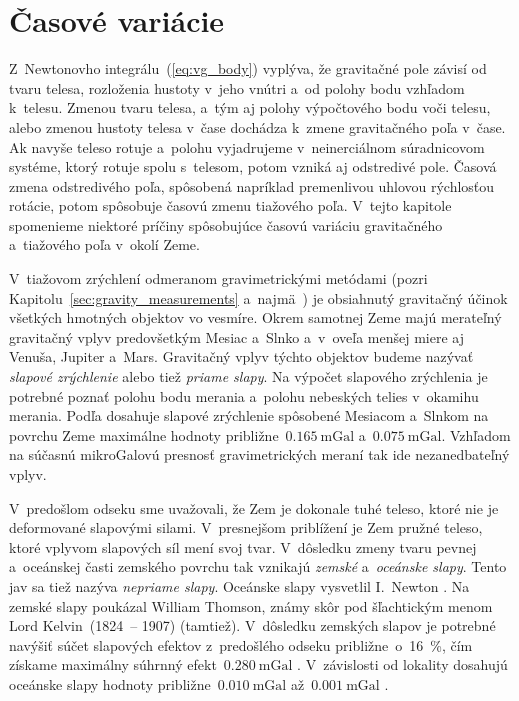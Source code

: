 \documentclass[a4paper, 12pt]{book}
\begin{document}
\section{Časové variácie}
\label{sec:time_variable_gravity}

Z~Newtonovho integrálu~(\ref{eq:vg_body}) vyplýva, že gravitačné pole závisí od 
tvaru telesa, rozloženia hustoty v~jeho vnútri a~od polohy bodu vzhľadom 
k~telesu.  Zmenou tvaru telesa, a~tým aj polohy výpočtového bodu voči telesu, 
alebo zmenou hustoty telesa v~čase dochádza k~zmene gravitačného poľa v~čase.  
Ak navyše teleso rotuje a~polohu vyjadrujeme v~neinerciálnom súradnicovom 
systéme, ktorý rotuje spolu s~telesom, potom vzniká aj odstredivé pole.  Časová 
zmena odstredivého poľa, spôsobená napríklad premenlivou uhlovou rýchlosťou 
rotácie, potom spôsobuje časovú zmenu tiažového poľa.  V~tejto kapitole 
spomenieme niektoré príčiny spôsobujúce časovú variáciu gravitačného 
a~tiažového poľa v~okolí Zeme.

V~tiažovom zrýchlení odmeranom gravimetrickými metódami (pozri 
Kapitolu~\ref{sec:gravity_measurements} a~najmä~\cite{Janak2010}) je obsiahnutý 
gravitačný účinok všetkých hmotných objektov vo vesmíre.  Okrem samotnej Zeme 
majú merateľný gravitačný vplyv predovšetkým Mesiac a~Slnko a~v~oveľa menšej 
miere aj Venuša, Jupiter a~Mars.  Gravitačný vplyv týchto objektov budeme 
nazývať \emph{slapové zrýchlenie} alebo tiež \emph{priame slapy}.  Na výpočet 
slapového zrýchlenia je potrebné poznať polohu bodu merania a~polohu nebeských 
telies v~okamihu merania.  Podľa \textcite{Torge1989} dosahuje slapové 
zrýchlenie spôsobené Mesiacom a~Slnkom na povrchu Zeme maximálne hodnoty 
približne~$0.165\ \mathrm{mGal}$ a~$0.075\ \mathrm{mGal}$.  Vzhľadom na súčasnú 
mikroGalovú presnosť gravimetrických meraní tak ide nezanedbateľný vplyv.

V~predošlom odseku sme uvažovali, že Zem je dokonale tuhé teleso, ktoré nie je 
deformované slapovými silami.  V~presnejšom priblížení je Zem pružné teleso, 
ktoré vplyvom slapových síl mení svoj tvar.  V~dôsledku zmeny tvaru pevnej 
a~oceánskej časti zemského povrchu tak vznikajú \emph{zemské} a~\emph{oceánske 
slapy}.  Tento jav sa tiež nazýva \emph{nepriame slapy}.  Oceánske slapy 
vysvetlil I.~Newton \parencite{Torge1989}.  Na zemské slapy poukázal William 
Thomson, známy skôr pod šľachtickým menom Lord Kelvin~(1824~-- 1907) (tamtiež).  
V~dôsledku zemských slapov je potrebné navýšiť súčet slapových efektov 
z~predošlého odseku približne~o~16~\%, čím získame maximálny súhrnný 
efekt~$0.280\ \mathrm{mGal}$ \parencite{Torge1989}.  V~závislosti od lokality 
dosahujú oceánske slapy hodnoty približne~$0.010\ \mathrm{mGal}$ až~$0.001\ 
\mathrm{mGal}$ \parencite{Torge1989}.
\end{document}
